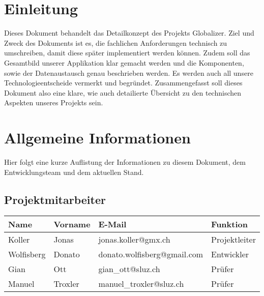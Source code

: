 


	

	\begin{center}
	\end{center}

	\section{Einleitung}
	Dieses Dokument behandelt das Detailkonzept des Projekts Globalizer. Ziel und Zweck des Dokuments ist es, die fachlichen Anforderungen technisch zu umschreiben, damit diese später implementiert werden können. Zudem soll das Gesamtbild unserer Applikation klar gemacht werden und die Komponenten, sowie der Datenaustausch genau beschrieben werden. Es werden auch all unsere Technologieentscheide vermerkt und begründet. Zusammengefasst soll dieses Dokument also eine klare, wie auch detailierte Übersicht zu den technischen Aspekten unseres Projekts sein.

	\newpage

	\section{Allgemeine Informationen}
	Hier folgt eine kurze Auflistung der Informationen zu diesem Dokument, dem Ent\-wicklungsteam und dem aktuellen Stand.

	\subsection{Projektmitarbeiter}
	\begin{table}[h]
		\begin{tabularx}{\textwidth}{|l|l|X|l|}
			\hline
			\textbf{Name} & \textbf{Vorname}  & \textbf{E-Mail}                & \textbf{Funktion}     \\ \hline
			Koller        & Jonas             & jonas.koller@gmx.ch            & Projektleiter         \\ \hline
			Wolfisberg    & Donato            & donato.wolfisberg@gmail.com    & Entwickler            \\ \hline
			Gian          & Ott               & gian\_ott@sluz.ch              & Prüfer                \\ \hline
			Manuel        & Troxler           & manuel\_troxler@sluz.ch        & Prüfer                \\ \hline
		\end{tabularx}
	\end{table}

